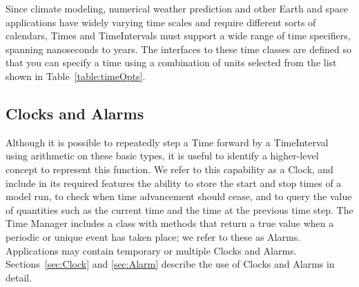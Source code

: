 Since climate modeling, numerical weather prediction and other 
Earth and space applications have widely varying time scales and require 
different sorts of calendars, Times and TimeIntervals must support 
a wide range of time specifiers, spanning nanoseconds to years.  The
interfaces to these time classes are defined so that you can specify a time
using a combination of units selected from the list shown in 
Table~\ref{table:timeOpts}.  



\subsection{Clocks and Alarms}
Although it is possible to repeatedly step a Time forward by a 
TimeInterval using arithmetic on these basic types, it is useful to 
identify a higher-level concept to represent this function.  We refer to 
this capability as a Clock, and include in its required features the 
ability to store the start and stop times of 
a model run, to check when time advancement should cease, 
and to query the value of quantities such as the current time and the
time at the previous time step.  The Time Manager includes a class 
with methods that return a true value when a periodic or unique event 
has taken place; we refer to these as Alarms.  Applications may contain 
temporary or multiple Clocks and Alarms.  Sections~\ref{sec:Clock} and
\ref{sec:Alarm} describe the use of Clocks and Alarms in detail.






